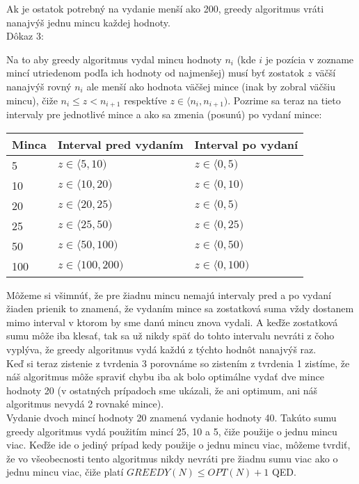 \documentclass[a4paper]{article}
\begin{document}
Ak je ostatok potrebný na vydanie menší ako 200, greedy algoritmus vráti nanajvýš jednu mincu každej hodnoty.   
\\

Dôkaz 3:

Na to aby greedy algoritmus vydal mincu hodnoty $n_i$ (kde $i$ je pozícia v zozname mincí utriedenom podľa ich hodnoty od najmenšej) musí byť zostatok $z$ väčší nanajvýš rovný $n_i$ ale menší ako hodnota väčšej mince (inak by zobral väčšiu mincu), čiže $n_i \leq z < n_{i+1}$ respektíve $z \in \langle n_i, n_{i+1} )$. Pozrime sa teraz na tieto intervaly pre jednotlivé mince a ako sa zmenia (posunú) po vydaní mince:

\begin{table}[!h]
	\begin{tabular}{|l|l|l|}
		\hline
		Minca & Interval pred vydaním & Interval po vydaní \\ \hline
		5     &$z \in \langle 5, 10 )$&$z \in \langle 0, 5 )$\\ \hline
		10    &$z \in \langle 10, 20 )$&$z \in \langle 0, 10 )$\\ \hline
		20    &$z \in \langle 20, 25 )$&$z \in \langle 0, 5 )$\\ \hline
		25    &$z \in \langle 25, 50 )$&$z \in \langle 0, 25 )$\\ \hline
		50    &$z \in \langle 50, 100 )$&$z \in \langle 0, 50 )$\\ \hline
		100   &$z \in \langle 100, 200 )$&$z \in \langle 0, 100 )$\\ \hline
	\end{tabular}
\end{table} 
Môžeme si všimnúť, že pre žiadnu mincu nemajú intervaly pred a po vydaní žiaden prienik to znamená, že vydaním mince sa zostatková suma vždy dostanem mimo interval v ktorom by sme danú mincu znova vydali. A keďže zostatková sumu môže iba klesať, tak sa už nikdy späť do tohto intervalu nevráti z čoho vyplýva, že greedy algoritmus vydá každú z týchto hodnôt nanajvýš raz.
\\

Keď si teraz zistenie z tvrdenia 3 porovnáme so zistením z tvrdenia 1 zistíme, že náš algoritmus môže spraviť chybu iba ak bolo optimálne vydať dve mince hodnoty 20 (v ostatných prípadoch sme ukázali, že ani optimum, ani náš algoritmus nevydá 2 rovnaké mince). 
\\

Vydanie dvoch mincí hodnoty 20 znamená vydanie hodnoty 40. Takúto sumu greedy algoritmus vydá použitím mincí 25, 10 a 5, čiže použije o jednu mincu viac. Keďže ide o jediný prípad kedy použije o jednu mincu viac, môžeme tvrdiť, že vo všeobecnosti tento algoritmus nikdy nevráti pre žiadnu sumu viac ako o jednu mincu viac, čiže platí $GREEDY(N) \leq OPT(N)+1$ QED.
\end{document}
